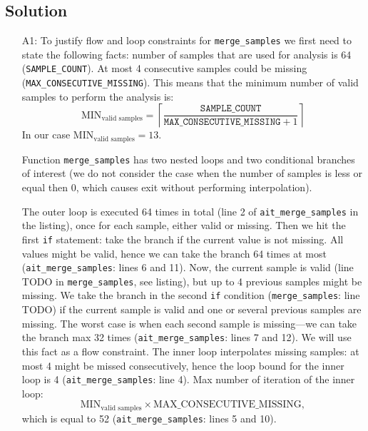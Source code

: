 \documentclass[12pt,a4paper,titlepage,oneside]{article}
\begin{document}
\subsection{Solution}
\begin{itemize}

\item[A1:]
  To justify flow and loop constraints for
  \texttt{merge\_samples} we first need to state the following facts:
  number of samples that are used for analysis is 64
  (\texttt{SAMPLE\_COUNT}). At most 4 consecutive samples could be
  missing (\texttt{MAX\_CONSECUTIVE\_MISSING}). This means that the
  minimum number of valid samples to perform the analysis is:
  \[
	{\text{MIN}_\text{valid samples}}  = \left\lceil\frac{\texttt{SAMPLE\_COUNT}}{\texttt{MAX\_CONSECUTIVE\_MISSING} + 1}\right\rceil
  \]
  In our case ${\text{MIN}_\text{valid samples}}=13$.
  
  Function \texttt{merge\_samples} has two nested loops and two conditional
  branches of interest (we do not consider the case when the number of
  samples is less or equal then 0, which causes exit without performing interpolation).

  The outer loop is executed 64 times in total (line 2 of \texttt{ait\_merge\_samples} in the
  listing), once for each sample, either valid or missing.
  Then we hit the first \texttt{if} statement: take the
  branch if the current value is not missing. All values might be valid,
  hence we can take the branch 64 times at most (\texttt{ait\_merge\_samples}:
  lines 6 and 11). Now, the current sample is valid (line TODO in
  \texttt{merge\_samples}, see listing), but up to
  4 previous samples might be missing. 
  We take the branch in the second \texttt{if} condition (\texttt{merge\_samples}: line
  TODO) if the current sample is valid and one or several previous 
  samples are missing.
  The worst case is when each second sample is missing---we
  can take the branch max 32 times (\texttt{ait\_merge\_samples}: lines 7
  and 12). We will use this fact as a flow
  constraint. The inner loop interpolates missing samples: at most 4
  might be missed consecutively, hence the loop bound for the inner
  loop is 4 (\texttt{ait\_merge\_samples}: line 4). 
  Max number of iteration of the inner loop:
  \[
  \text{MIN}_\text{valid samples} \times
  \text{MAX\_CONSECUTIVE\_MISSING},
  \]
  which is equal to 52
  (\texttt{ait\_merge\_samples}: lines 5 and 10).


\end{itemize}
\end{document}
